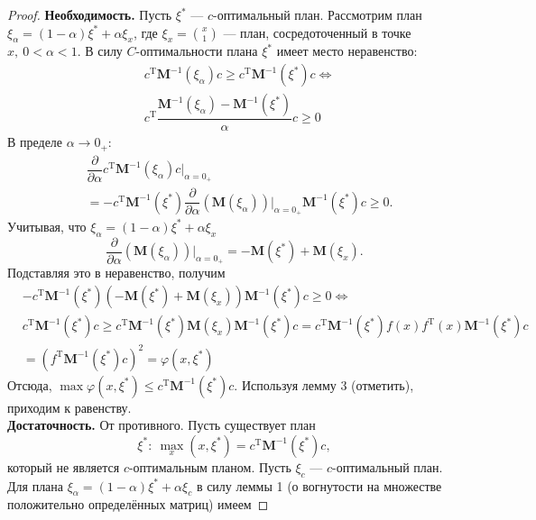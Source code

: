 \documentclass[12pt, a4paper]{article}
\begin{document}
	\begin{proof}
		\textbf{Необходимость.} Пусть $\xi^*$ --- $c$-оптимальный план. Рассмотрим план $\xi_\alpha=(1-\alpha)\xi^*+\alpha\xi_x$, где $\xi_x={x \choose 1}$ --- план, сосредоточенный в точке $x,~0<\alpha<1$. В силу $C$-оптимальности плана $\xi^*$ имеет место неравенство:
		\begin{align*}
			&c^\mathrm{T}\mathbf{M}^{-1}(\xi_\alpha)c\geqslant c^\mathrm{T}\mathbf{M}^{-1}(\xi^*)c\Leftrightarrow\\
			&c^\mathrm{T}\dfrac{\mathbf{M}^{-1}(\xi_\alpha)-\mathbf{M}^{-1}(\xi^*)}{\alpha}c\geqslant0
		\end{align*} 
		В пределе $\alpha\rightarrow 0_+$:
		\begin{align*}
			&\dfrac{\partial}{\partial\alpha}c^\mathrm{T}\mathbf{M}^{-1}(\xi_\alpha)c|_{\alpha=0_+}\\
			&=-c^\mathrm{T}\mathbf{M}^{-1}(\xi^*)\dfrac{\partial}{\partial\alpha}\left(\mathbf{M}(\xi_\alpha)\right)|_{\alpha=0_+}\mathbf{M}^{-1}(\xi^*)c\geqslant0.
		\end{align*}
		Учитывая, что $\xi_\alpha=(1-\alpha)\xi^*+\alpha\xi_x$
		\begin{equation*}
			\dfrac{\partial}{\partial\alpha}\left(\mathbf{M}(\xi_\alpha)\right)|_{\alpha=0_+}=-\mathbf{M}(\xi^*)+\mathbf{M}(\xi_x).
		\end{equation*}
		Подставляя это в неравенство, получим
		\begin{align*}
			&-c^\mathrm{T}\mathbf{M}^{-1}(\xi^*)\left(-\mathbf{M}(\xi^*)+\mathbf{M}(\xi_x)\right)\mathbf{M}^{-1}(\xi^*)c\geqslant0\Leftrightarrow\\
			&c^\mathrm{T}\mathbf{M}^{-1}(\xi^*)c\geqslant c^\mathrm{T}\mathbf{M}^{-1}(\xi^*)\mathbf{M}(\xi_x)\mathbf{M}^{-1}(\xi^*)c=c^\mathrm{T}\mathbf{M}^{-1}(\xi^*)f(x)f^\mathrm{T}(x)\mathbf{M}^{-1}(\xi^*)c\\
			&=(f^\mathrm{T}\mathbf{M}^{-1}(\xi^*)c)^2=\varphi(x,\xi^*)
		\end{align*} 
		Отсюда, $\max\varphi(x,\xi^*)\leqslant c^\mathrm{T}\mathbf{M}^{-1}(\xi^*)c$. Используя лемму 3 (отметить), приходим к равенству.\\
		\textbf{Достаточность.} От противного. Пусть существует план
		\begin{equation*}
			\xi^*:~\max_x(x,\xi^*)=c^\mathrm{T}\mathbf{M}^{-1}(\xi^*)c,
		\end{equation*}
		который не является $c$-оптимальным планом. Пусть $\xi_c$ --- $c$-оптимальный план. Для плана $\xi_\alpha=(1-\alpha)\xi^*+\alpha\xi_c$ в силу леммы 1 (о вогнутости на множестве положительно определённых матриц) имеем

\end{proof}
\end{document}
